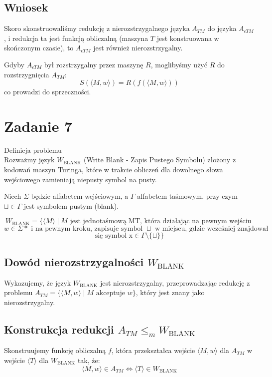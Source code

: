 \documentclass{article}
\begin{document}
\subsection*{Wniosek}



Skoro skonstruowaliśmy redukcję z nierozstrzygalnego języka $A_{TM}$ do języka $A_{\epsilon TM}$, i redukcja ta jest funkcją obliczalną (maszyna $T$ jest konstruowana w skończonym czasie), to $A_{\epsilon TM}$ jest również nierozstrzygalny.

Gdyby $A_{\epsilon TM}$ był rozstrzygalny przez maszynę $R$, moglibyśmy użyć $R$ do rozstrzygnięcia $A_{TM}$:
$$
S(\langle M, w \rangle) = R(f(\langle M, w \rangle))
$$
co prowadzi do sprzeczności.


\section{Zadanie 7}
Definicja problemu\\
Rozważmy język $W_{\mathrm{BLANK}}$ (Write Blank - Zapis Pustego Symbolu) złożony z kodowań maszyn Turinga, które w trakcie obliczeń dla dowolnego słowa wejściowego zamieniają niepusty symbol na pusty.

Niech $\Sigma$ będzie alfabetem wejściowym, a $\Gamma$ alfabetem taśmowym, przy czym $\sqcup \in \Gamma$ jest symbolem pustym (blank).

\[
W_{\mathrm{BLANK}} = \{\langle M \rangle \mid M \text{ jest jednotaśmową MT, która działając na pewnym wejściu }\]
\[
w \in \Sigma* \text{ i na pewnym kroku, zapisuje symbol } \sqcup \text{ w miejscu, gdzie wcześniej znajdował} \]
\[
\text{się symbol  x} \in \Gamma \setminus \{\sqcup\}\}
\]

\subsection*{Dowód nierozstrzygalności $W_{\mathrm{BLANK}}$}

Wykazujemy, że język $W_{\mathrm{BLANK}}$ jest nierozstrzygalny, przeprowadzając redukcję z problemu $A_{TM} = \{\langle M, w \rangle \mid M \text{ akceptuje } w\}$, który jest znany jako nierozstrzygalny.

\subsection*{Konstrukcja redukcji $A_{TM} \le_m W_{\mathrm{BLANK}}$}

Skonstruujemy funkcję obliczalną $f$, która przekształca wejście $\langle M, w \rangle$ dla $A_{TM}$ w wejście $\langle T \rangle$ dla $W_{\mathrm{BLANK}}$ tak, że:
$$
\langle M, w \rangle \in A_{TM} \iff \langle T \rangle \in W_{\mathrm{BLANK}}
$$
\end{document}

